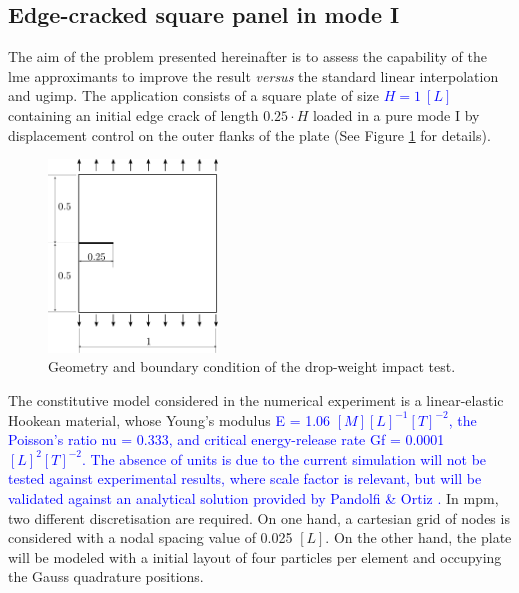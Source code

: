 \documentclass[preprint,12pt,a4paper]{elsarticle}
\newcommand{\MMP}[1]{
  \textcolor{blue}{{#1}}
}
\begin{document}
\subsection{Edge-cracked square panel in mode I}
\label{sec:3.1}
The aim of the problem presented hereinafter is to assess the
capability of the \acrshort{lme} approximants to improve the result
\textit{versus} the standard linear interpolation and \acrshort{ugimp}. The application
consists of a square plate of size\MMP{$H = 1\ [L] $} containing an initial edge
crack of length $0.25 \cdot H$ loaded in a pure mode I by displacement
control on the outer flanks of the plate (See Figure
\ref{fig:geometry-cracked-panel-mode-I} for details). 
\begin{figure}
  \centering
  \includegraphics[width=0.4\textwidth]{Figure-Mode_I}
  \caption{Geometry and boundary condition of the drop-weight impact test.}
  \label{fig:geometry-cracked-panel-mode-I}
\end{figure}
The constitutive model considered in the numerical experiment is a
linear-elastic Hookean material, whose Young's modulus \MMP{\gls{E} = 1.06
$[M] [L]^{-1} [T]^{-2}$, the Poisson's ratio \gls{nu} = 0.333, and
critical energy-release rate \gls{Gf} = 0.0001 $[L]^{2} [T]^{-2}$. The absence of units is due to the current
simulation will not be tested against experimental results, where
scale factor is relevant, but will be validated against an analytical
solution provided by Pandolfi \& Ortiz \cite{Pandolfi_2012}.} In
\acrshort{mpm}, two different discretisation are required. On one
hand, a cartesian grid of nodes is considered with a nodal spacing
value of 0.025 $[L]$. On the other hand, the plate will be modeled with a
initial layout of four particles per element and occupying the Gauss
quadrature positions.\\
\end{document}

